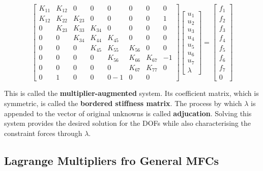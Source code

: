 \documentclass[10pt,b5paper,titlepage]{book}
\begin{document}
\begin{equation}
    \begin{bmatrix}
        K_{11} & K_{12} & 0 & 0 & 0 & 0 & 0 & 0 \\
        K_{12} & K_{22} & K_{23} & 0 & 0 & 0 & 0 & 1 \\
        0 & K_{23} & K_{33} & K_{34} & 0 & 0 & 0 & 0 \\
        0 & 0 & K_{34} & K_{44} & K_{45} & 0 & 0 & 0 \\
        0 & 0 & 0 & K_{45} & K_{55} & K_{56} & 0 & 0 \\
        0 & 0 & 0 & 0 & K_{56} & K_{66} & K_{67} & -1 \\
        0 & 0 & 0 & 0 & 0 & K_{67} & K_{77} & 0 \\
        0 & 1 & 0 & 0 & 0 -1 & 0 & 0
    \end{bmatrix}
    \begin{bmatrix}
        u_1 \\
        u_2 \\
        u_3 \\
        u_4 \\
        u_5 \\
        u_6 \\
        u_7 \\
        \lambda
    \end{bmatrix}
    = \begin{bmatrix}
        f_1 \\
        f_2 \\
        f_3 \\
        f_4 \\
        f_5 \\
        f_6 \\
        f_7 \\
        0
    \end{bmatrix}
\end{equation}

This is called the \textbf{multiplier-augmented} system. Its coefficient matrix,
which is symmetric, is called the \textbf{bordered stiffness matrix}. The
process by which $ \lambda $ is appended to the vector of original unknowns
is called \textbf{adjucation}. Solving this system provides the desired solution
for the DOFs while also characterising the constraint forces through
$ \lambda $.


\subsection{Lagrange Multipliers fro General MFCs}
\end{document}
